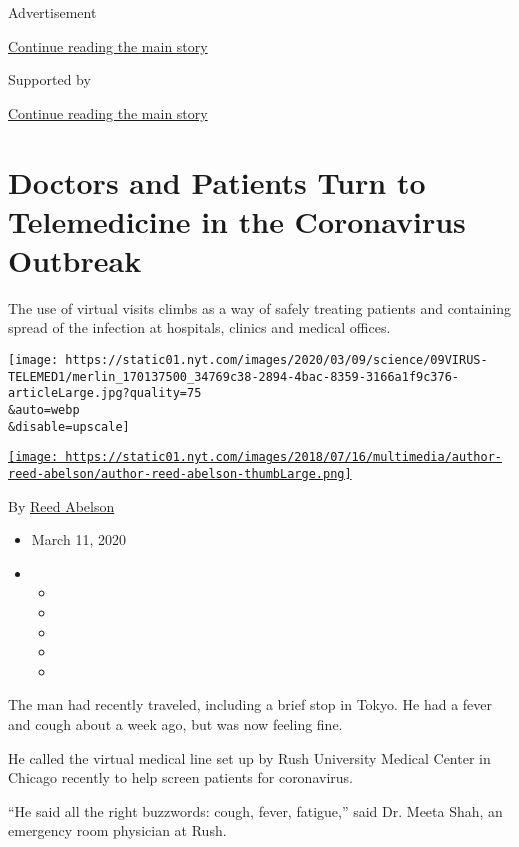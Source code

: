 Advertisement

\protect\hyperlink{after-top}{Continue reading the main story}

Supported by

\protect\hyperlink{after-sponsor}{Continue reading the main story}

\hypertarget{doctors-and-patients-turn-to-telemedicine-in-the-coronavirus-outbreak}{%
\section{Doctors and Patients Turn to Telemedicine in the Coronavirus
Outbreak}\label{doctors-and-patients-turn-to-telemedicine-in-the-coronavirus-outbreak}}

The use of virtual visits climbs as a way of safely treating patients
and containing spread of the infection at hospitals, clinics and medical
offices.

\texttt{[image: https://static01.nyt.com/images/2020/03/09/science/09VIRUS-TELEMED1/merlin\_170137500\_34769c38-2894-4bac-8359-3166a1f9c376-articleLarge.jpg?quality=75\\\&auto=webp\\\&disable=upscale]}

\href{https://www.nytimes.com/by/reed-abelson}{\texttt{[image: https://static01.nyt.com/images/2018/07/16/multimedia/author-reed-abelson/author-reed-abelson-thumbLarge.png]}}

By \href{https://www.nytimes.com/by/reed-abelson}{Reed Abelson}

\begin{itemize}
\item
  March 11, 2020
\item
  \begin{itemize}
  \item
  \item
  \item
  \item
  \item
  \end{itemize}
\end{itemize}

The man had recently traveled, including a brief stop in Tokyo. He had a
fever and cough about a week ago, but was now feeling fine.

He called the virtual medical line set up by Rush University Medical
Center in Chicago recently to help screen patients for coronavirus.

``He said all the right buzzwords: cough, fever, fatigue,'' said Dr.
Meeta Shah, an emergency room physician at Rush.

